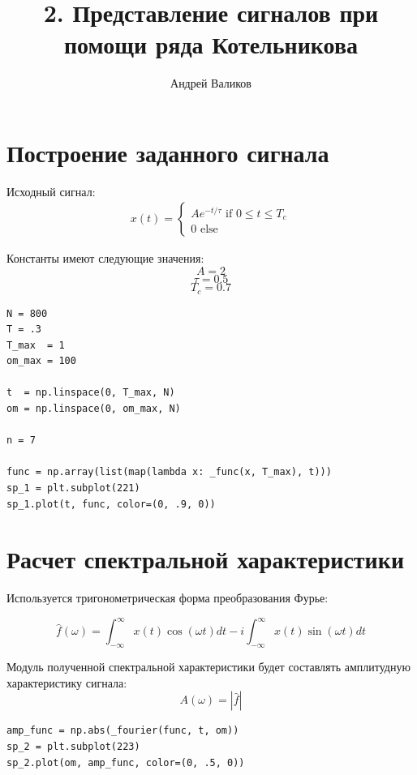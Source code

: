 \documentclass[12pt]{article}
\begin{document}
\title{2. Представление сигналов при помощи ряда Котельникова}
\author{Андрей Валиков}
\date{}
\maketitle
																																																								\section{Построение заданного сигнала}
																																																																																																													
Исходный сигнал:
\begin{gather*}
x(t) = 
\begin{cases}
  Ae^{-t/\tau} \text{ if $0\leq t\leq T_c$}\\
  0 \text{ else}    
\end{cases}
\end{gather*}

\noindent Константы имеют следующие значения:
\[A = 2\]
\[\tau = 0.5\]
\[T_c = 0.7\]

\begin{lstlisting}
N = 800
T = .3
T_max  = 1
om_max = 100

t  = np.linspace(0, T_max, N)
om = np.linspace(0, om_max, N)

n = 7

func = np.array(list(map(lambda x: _func(x, T_max), t)))
sp_1 = plt.subplot(221)
sp_1.plot(t, func, color=(0, .9, 0))
\end{lstlisting}



\section{ Расчет спектральной характеристики}
Используется тригонометрическая форма преобразования Фурье:

\[\hat{f}(\omega) = \int_{-\infty}^{\infty}x(t)\cos(\omega t)dt -
 i\int_{-\infty}^{\infty}x(t)\sin(\omega t)dt\]
 
\noindent Модуль полученной спектральной характеристики будет составлять амплитудную характеристику сигнала:
\[A(\omega) = |\hat{f}|\]


\begin{lstlisting}
amp_func = np.abs(_fourier(func, t, om))
sp_2 = plt.subplot(223)
sp_2.plot(om, amp_func, color=(0, .5, 0))
\end{lstlisting}
\end{document}
